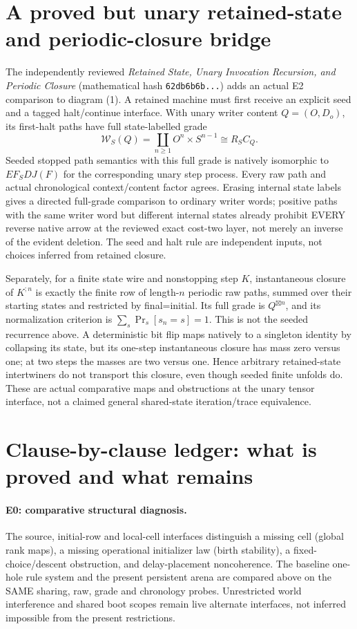 \documentclass[11pt]{article}
\begin{document}
\section{A proved but unary retained-state and periodic-closure bridge}
The independently reviewed \emph{Retained State, Unary Invocation Recursion,
and Periodic Closure} (mathematical hash \texttt{62db6b6b...}) adds an actual
E2 comparison to diagram (1). A retained machine must first receive an
explicit seed and a tagged halt/continue interface. With unary writer
content $Q=(O,D_o)$, its first-halt paths have full state-labelled grade
\[
 \mathcal W_S(Q)=\coprod_{n\geq1}O^n\times S^{n-1}
 \cong R_S C_Q.
\]
Seeded stopped path semantics with this full grade is natively isomorphic
to $E F_S D J(F)$ for the corresponding unary step process. Every raw path
and actual chronological context/content factor agrees. Erasing internal
state labels gives a directed full-grade comparison to ordinary writer
words; positive paths with the same writer word but different internal
states already prohibit EVERY reverse native arrow at the reviewed exact
cost-two layer, not merely an inverse of the evident deletion. The seed and halt rule are independent inputs, not
choices inferred from retained closure.

Separately, for a finite state wire and nonstopping step $K$, instantaneous
closure of $K^{;n}$ is exactly the finite row of length-$n$ periodic raw paths,
summed over their starting states and restricted by final=initial. Its full
grade is $Q^{\boxtimes n}$, and its normalization criterion is
$\sum_s\Pr_s[s_n=s]=1$. This is not the seeded recurrence above. A deterministic
bit flip maps natively to a singleton identity by collapsing its state, but
its one-step instantaneous closure has mass zero versus one; at two steps
the masses are two versus one. Hence arbitrary retained-state intertwiners
do not transport this closure, even though seeded finite unfolds do.
These are actual comparative maps and obstructions at the unary tensor
interface, not a claimed general shared-state iteration/trace equivalence.

\section{Clause-by-clause ledger: what is proved and what remains}
\paragraph{E0: comparative structural diagnosis.}
The source, initial-row and local-cell interfaces distinguish a missing cell
(global rank maps), a missing operational initializer law (birth stability),
a fixed-choice/descent obstruction, and delay-placement noncoherence.
The baseline one-hole rule system and the present persistent arena are
compared above on the SAME sharing, raw, grade and chronology probes.
Unrestricted world interference and shared boot scopes remain live alternate
interfaces, not inferred impossible from the present restrictions.
\end{document}
